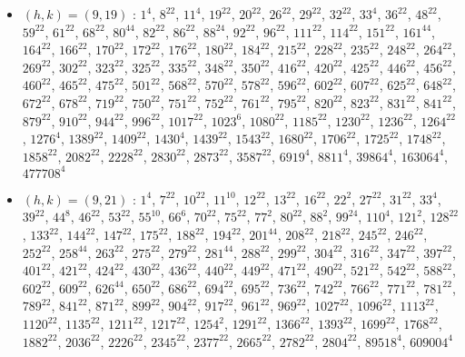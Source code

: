 \begin{itemize}
\item $(h,k)=(9,19)$ : $1^{4}$, $8^{22}$, $11^{4}$, $19^{22}$, $20^{22}$, $26^{22}$, $29^{22}$, $32^{22}$, $33^{4}$, $36^{22}$, $48^{22}$, $59^{22}$, $61^{22}$, $68^{22}$, $80^{44}$, $82^{22}$, $86^{22}$, $88^{24}$, $92^{22}$, $96^{22}$, $111^{22}$, $114^{22}$, $151^{22}$, $161^{44}$, $164^{22}$, $166^{22}$, $170^{22}$, $172^{22}$, $176^{22}$, $180^{22}$, $184^{22}$, $215^{22}$, $228^{22}$, $235^{22}$, $248^{22}$, $264^{22}$, $269^{22}$, $302^{22}$, $323^{22}$, $325^{22}$, $335^{22}$, $348^{22}$, $350^{22}$, $416^{22}$, $420^{22}$, $425^{22}$, $446^{22}$, $456^{22}$, $460^{22}$, $465^{22}$, $475^{22}$, $501^{22}$, $568^{22}$, $570^{22}$, $578^{22}$, $596^{22}$, $602^{22}$, $607^{22}$, $625^{22}$, $648^{22}$, $672^{22}$, $678^{22}$, $719^{22}$, $750^{22}$, $751^{22}$, $752^{22}$, $761^{22}$, $795^{22}$, $820^{22}$, $823^{22}$, $831^{22}$, $841^{22}$, $879^{22}$, $910^{22}$, $944^{22}$, $996^{22}$, $1017^{22}$, $1023^{6}$, $1080^{22}$, $1185^{22}$, $1230^{22}$, $1236^{22}$, $1264^{22}$, $1276^{4}$, $1389^{22}$, $1409^{22}$, $1430^{4}$, $1439^{22}$, $1543^{22}$, $1680^{22}$, $1706^{22}$, $1725^{22}$, $1748^{22}$, $1858^{22}$, $2082^{22}$, $2228^{22}$, $2830^{22}$, $2873^{22}$, $3587^{22}$, $6919^{4}$, $8811^{4}$, $39864^{4}$, $163064^{4}$, $477708^{4}$
\item $(h,k)=(9,21)$ : $1^{4}$, $7^{22}$, $10^{22}$, $11^{10}$, $12^{22}$, $13^{22}$, $16^{22}$, $22^{2}$, $27^{22}$, $31^{22}$, $33^{4}$, $39^{22}$, $44^{8}$, $46^{22}$, $53^{22}$, $55^{10}$, $66^{6}$, $70^{22}$, $75^{22}$, $77^{2}$, $80^{22}$, $88^{2}$, $99^{24}$, $110^{4}$, $121^{2}$, $128^{22}$, $133^{22}$, $144^{22}$, $147^{22}$, $175^{22}$, $188^{22}$, $194^{22}$, $201^{44}$, $208^{22}$, $218^{22}$, $245^{22}$, $246^{22}$, $252^{22}$, $258^{44}$, $263^{22}$, $275^{22}$, $279^{22}$, $281^{44}$, $288^{22}$, $299^{22}$, $304^{22}$, $316^{22}$, $347^{22}$, $397^{22}$, $401^{22}$, $421^{22}$, $424^{22}$, $430^{22}$, $436^{22}$, $440^{22}$, $449^{22}$, $471^{22}$, $490^{22}$, $521^{22}$, $542^{22}$, $588^{22}$, $602^{22}$, $609^{22}$, $626^{44}$, $650^{22}$, $686^{22}$, $694^{22}$, $695^{22}$, $736^{22}$, $742^{22}$, $766^{22}$, $771^{22}$, $781^{22}$, $789^{22}$, $841^{22}$, $871^{22}$, $899^{22}$, $904^{22}$, $917^{22}$, $961^{22}$, $969^{22}$, $1027^{22}$, $1096^{22}$, $1113^{22}$, $1120^{22}$, $1135^{22}$, $1211^{22}$, $1217^{22}$, $1254^{2}$, $1291^{22}$, $1366^{22}$, $1393^{22}$, $1699^{22}$, $1768^{22}$, $1882^{22}$, $2036^{22}$, $2226^{22}$, $2345^{22}$, $2377^{22}$, $2665^{22}$, $2782^{22}$, $2804^{22}$, $89518^{4}$, $609004^{4}$

\end{itemize}
